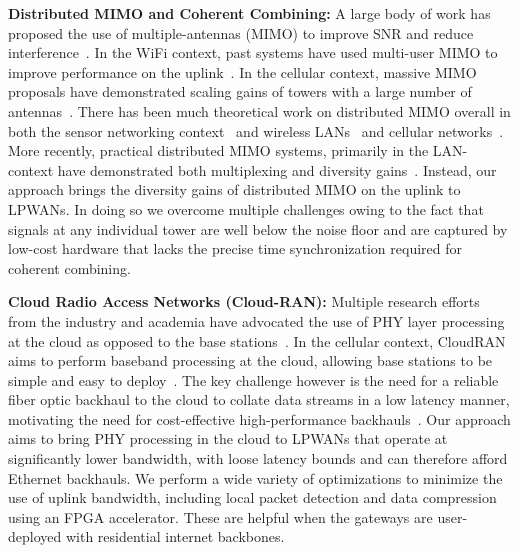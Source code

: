 \noindent \textbf{Distributed MIMO and Coherent Combining: } A large body of
work has proposed the use of multiple-antennas (MIMO) to improve SNR and
reduce interference~\cite{xie2014scalable, lin2011random, kumar2013bringing}.
In the WiFi context, past systems have used multi-user MIMO to improve
performance on the uplink~\cite{shen2014rate, tan2009sam, xie2014scalable}. In
the cellular context, massive MIMO proposals have demonstrated scaling gains
of towers with a large number of antennas~\cite{shepard2012argos,
larsson2014massive}. There has been much theoretical work on distributed MIMO
overall in both the sensor networking context~\cite{del2007cooperative} and
wireless LANs~\cite{dohler2004resource} and cellular
networks~\cite{sawahashi2010coordinated}.  More recently, practical
distributed MIMO systems, primarily in the LAN-context have demonstrated both
multiplexing and diversity gains~\cite{hamed2016real, yenamandra2014vidyut,
rahul2012jmb}. Instead, our approach brings the diversity gains of distributed
MIMO on the uplink to LPWANs. In doing so we overcome multiple challenges
owing to the fact that signals at any individual tower are well below the
noise floor and are captured by low-cost hardware that lacks the precise time
synchronization required for coherent combining.

\noindent \textbf{Cloud Radio Access Networks (Cloud-RAN): } Multiple research
efforts from the industry and academia have advocated the use of PHY layer
processing at the cloud as opposed to the base stations~\cite{sabella2013ran,
hadzialic2013cloud}. In the cellular context, CloudRAN aims to perform
baseband processing at the cloud, allowing base stations to be simple and easy
to deploy~\cite{checko2015cloud, wubben2014benefits}. The key challenge
however is the need for a reliable fiber optic backhaul to the cloud to
collate data streams in a low latency manner, motivating the need for
cost-effective high-performance backhauls~\cite{liu2013case, chih2014recent}.
Our approach aims to bring PHY processing in the cloud to LPWANs that operate
at significantly lower bandwidth, with loose latency bounds and can therefore
afford Ethernet backhauls. We perform a wide variety of optimizations to
minimize the use of uplink bandwidth, including local packet detection and
data compression using an FPGA accelerator. These are helpful when the
gateways are user-deployed with residential internet backbones.